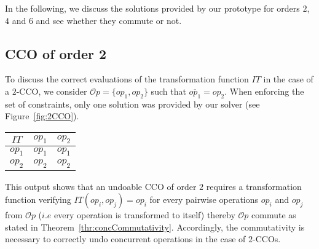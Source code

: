 \documentclass[submission,copyright,creativecommons]{eptcs}
\begin{document}
In the following, we discuss the solutions provided by our prototype for orders $2$, $4$ and $6$ and see whether they commute or not. 
\subsection{CCO of order 2}
To discuss the correct evaluations of the transformation function $IT$ in the case of a $2$-CCO, we consider  $\mathcal{O}p=\{op_1, op_2\}$ such that $\overline{op_1}=op_2$. 
When enforcing the set of constraints, only one solution was provided by our solver (see Figure~\ref{fig:2CCO}).
\begin{table*}[htbp]

      \centering \begin{small} 
      \begin{tabular}{|c|c|c|}
\hline
$IT$&  $op_1$ &   $op_2$  \\ \hline
$op_1$& $op_1$ & $op_1$\\ \hline 
$op_2$ &  $op_2$& $op_2$\\ \hline 
\end{tabular}
\end{small}
   \label{fig:2CCO}
\end{table*}
\vspace{-.4cm} 
 This output shows that an undoable CCO of order $2$  requires a transformation function verifying  $IT(op_i, op_j)=op_i$  for every pairwise operations $op_i$ and $op_j$ from 
$\mathcal{O}p$ ($i.e$ every operation is transformed to itself) thereby $\mathcal{O}p$ commute as stated in Theorem~\ref{thr:concCommutativity}. Accordingly,   the commutativity is necessary to correctly undo concurrent operations in the case of $2$-CCOs.







 
\end{document}
